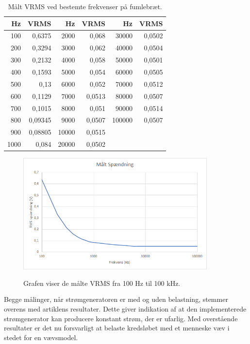 \begin{table}[H]
\centering
\begin{tabular}{| r | r || r | r || r | r |}
    \hline
    \textbf{Hz} & \textbf{VRMS} & \textbf{Hz} & \textbf{VRMS} & \textbf{Hz} & \textbf{VRMS}\\ \hline
    100 & 0,6375 & 2000 & 0,068 & 30000 & 0,0502 \\ \hline
    200 & 0,3294 & 3000 & 0,062 & 40000 & 0,0504   \\ \hline
    300 & 0,2132 & 4000 & 0,058 & 50000 & 0,0501   \\ \hline
    400 & 0,1593 & 5000 & 0,054 & 60000 & 0,0505   \\ \hline
    500 & 0,13 & 6000 & 0,052 & 70000 & 0,0512  \\ \hline
    600 & 0,1129 & 7000 & 0,0513 & 80000 & 0,0507   \\ \hline
    700 & 0,1015 & 8000 & 0,051 & 90000 & 0,0514  \\ \hline
    800 & 0,09345 & 9000 & 0,0507 & 100000 & 0,0507   \\ \hline
    900 & 0,08805 & 10000 & 0,0515 &  &     \\ \hline
    1000 & 0,084 & 20000 & 0,0502 & &   \\ \hline
\end{tabular}
    \caption{Målt VRMS ved bestemte frekvenser på fumlebræt.}
    \label{table:fumlebraetfrekvenservrms}
\end{table} 


\begin{figure}[H]
\centering
{\includegraphics[width=10cm]
{Figure/testopstilling1fumlevrmsgraf}}
\caption{Grafen viser de målte VRMS fra 100 Hz til 100 kHz.}
\label{fig:testopstilling1fumlevrmsgraf}
\end{figure}


Begge målinger, når strømgeneratoren er med og uden belastning, stemmer overens med artiklens resultater. Dette giver indikation af at den implementerede strømgenerator kan producere konstant strøm, der er ufarlig. Med overstående resultater er det nu forsvarligt  at belaste kredsløbet med et menneske væv i stedet for en vævsmodel.   

